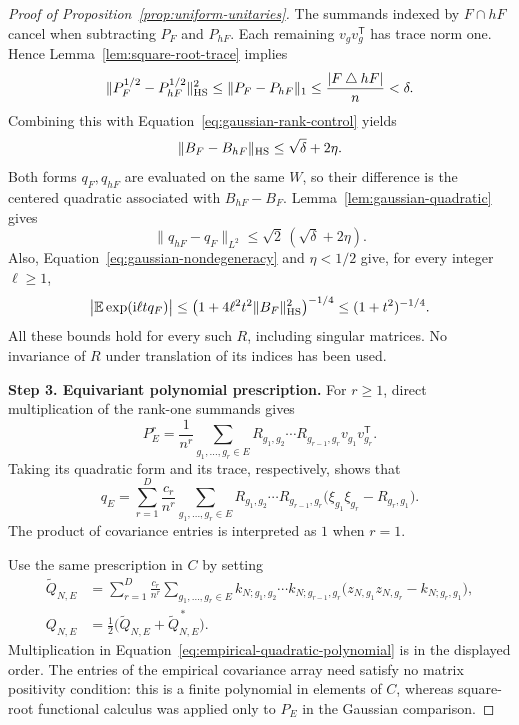 \begin{proof}[Proof of Proposition~\ref{prop:uniform-unitaries}]
The summands indexed by \(F\cap hF\) cancel when subtracting
\(P_F\) and \(P_{hF}\). Each remaining \(v_gv_g^{\mathsf T}\)
has trace norm one. Hence Lemma~\ref{lem:square-root-trace}
implies
\[
 \|P_F^{1/2}-P_{hF}^{1/2}\|_{\mathrm{HS}}^2
 \leq\|P_F-P_{hF}\|_1
 \leq\frac{|F\mathbin{\triangle}hF|}{n}<\delta.
\]
Combining this with Equation~\eqref{eq:gaussian-rank-control} yields
\[
 \|B_F-B_{hF}\|_{\mathrm{HS}}\leq\sqrt{\delta}+2\eta.
\]
Both forms \(q_F,q_{hF}\) are evaluated on the same \(W\), so
their difference is the centered quadratic associated with
\(B_{hF}-B_F\). Lemma~\ref{lem:gaussian-quadratic} gives
\begin{equation}\label{eq:gaussian-translation-bound}
 \|q_{hF}-q_F\|_{L^2}
 \leq\sqrt{2}\,(\sqrt{\delta}+2\eta).
\end{equation}
Also, Equation~\eqref{eq:gaussian-nondegeneracy} and \(\eta<1/2\)
give, for every integer \(\ell\geq1\),
\begin{equation}\label{eq:gaussian-fourier-bound}
 \bigl|\mathbb E\exp(\mathrm{i}\ell t q_F)\bigr|
 \leq
 \bigl(1+4\ell^2t^2\|B_F\|_{\mathrm{HS}}^2\bigr)^{-1/4}
 \leq(1+t^2)^{-1/4}.
\end{equation}
All these bounds hold for every such \(R\), including singular
matrices. No invariance of \(R\) under translation of its indices
has been used.

\textbf{Step 3. Equivariant polynomial prescription.}
For \(r\geq1\), direct multiplication of the rank-one summands
gives
\[
 P_E^r
 =\frac1{n^r}
  \sum_{g_1,\ldots,g_r\in E}
  R_{g_1,g_2}\cdots R_{g_{r-1},g_r}
  v_{g_1}v_{g_r}^{\mathsf T}.
\]
Taking its quadratic form and its trace, respectively, shows that
\begin{equation}\label{eq:gaussian-covariance-polynomial}
 q_E=
 \sum_{r=1}^{D}\frac{c_r}{n^r}
 \sum_{g_1,\ldots,g_r\in E}
 R_{g_1,g_2}\cdots R_{g_{r-1},g_r}
 \bigl(\xi_{g_1}\xi_{g_r}-R_{g_r,g_1}\bigr).
\end{equation}
The product of covariance entries is interpreted as \(1\) when
\(r=1\).

Use the same prescription in \(C\) by setting
\begin{align}
 \widetilde Q_{N,E}
 &=
 \sum_{r=1}^{D}\frac{c_r}{n^r}
 \sum_{g_1,\ldots,g_r\in E}
 k_{N;g_1,g_2}\cdots k_{N;g_{r-1},g_r}
 \bigl(z_{N,g_1}z_{N,g_r}-k_{N;g_r,g_1}\bigr),
 \label{eq:empirical-quadratic-polynomial}\\
 Q_{N,E}
 &=\tfrac12\bigl(\widetilde Q_{N,E}
                 +\widetilde Q_{N,E}^{\,*}\bigr).
 \label{eq:empirical-quadratic-selfadjoint}
\end{align}
Multiplication in Equation~\eqref{eq:empirical-quadratic-polynomial} is
in the displayed order. The entries of the empirical covariance
array need satisfy no matrix positivity condition: this is a
finite polynomial in elements of \(C\), whereas square-root
functional calculus was applied only to \(P_E\) in the Gaussian
comparison.


\end{proof}
